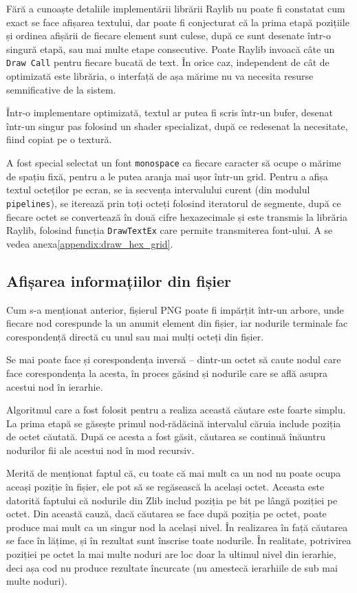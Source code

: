 \documentclass[a4paper,12pt]{report}
\begin{document}
Fără a cunoaște detaliile implementării librării Raylib nu poate fi constatat cum exact se face afișarea textului,
dar poate fi conjecturat că la prima etapă pozițiile și ordinea afișării de fiecare element sunt culese,
după ce sunt desenate într-o singură etapă, sau mai multe etape consecutive.
Poate Raylib invoacă câte un \texttt{Draw Call} pentru fiecare bucată de text.
În orice caz, independent de cât de optimizată este librăria,
o interfață de așa mărime nu va necesita resurse semnificative de la sistem.

Într-o implementare optimizată, textul ar putea fi scris într-un bufer,
desenat într-un singur pas folosind un shader specializat,
după ce redesenat la necesitate, fiind copiat pe o textură.

A fost special selectat un font \texttt{monospace} ca fiecare caracter să ocupe o mărime de spațiu fixă,
pentru a le putea aranja mai ușor într-un grid.
Pentru a afișa textul octeților pe ecran, se ia secvența intervalului curent (din modulul \texttt{pipelines}),
se iterează prin toți octeți folosind iteratorul de segmente,
după ce fiecare octet se convertează în două cifre hexazecimale și este transmis la librăria Raylib,
folosind funcția \texttt{DrawTextEx} care permite transmiterea font-ului.
A se vedea anexa\ref{appendix:draw_hex_grid}.

\subsection{Afișarea informațiilor din fișier}

Cum s-a menționat anterior, fișierul \ac{PNG} poate fi impărțit într-un arbore,
unde fiecare nod corespunde la un anumit element din fișier,
iar nodurile terminale fac corespondență directă cu unul sau mai mulți octeți din fișier.

Se mai poate face și corespondența inversă -- dintr-un octet să caute nodul care face corespondența la acesta,
în proces găsind și nodurile care se află asupra acestui nod în ierarhie.

Algoritmul care a fost folosit pentru a realiza această căutare este foarte simplu.
La prima etapă se găsește primul nod-rădăcină intervalul căruia include poziția de octet căutată.
După ce acesta a fost găsit, căutarea se continuă înăuntru nodurilor fii ale acestui nod în mod recursiv.

Merită de menționat faptul că, cu toate că mai mult ca un nod nu poate ocupa aceași poziție în fișier,
ele pot să se regăsească la același octet.
Aceasta este datorită faptului că nodurile din Zlib includ poziția pe bit pe lângă poziției pe octet.
Din această cauză, dacă căutarea se face după poziția pe octet,
poate produce mai mult ca un singur nod la același nivel.
În realizarea în față căutarea se face în lățime, și în rezultat sunt înscrise toate nodurile.
În realitate, potrivirea poziției pe octet la mai multe noduri are loc doar la ultimul nivel din ierarhie,
deci așa cod nu produce rezultate încurcate (nu amestecă ierarhiile de sub mai multe noduri).
\end{document}
